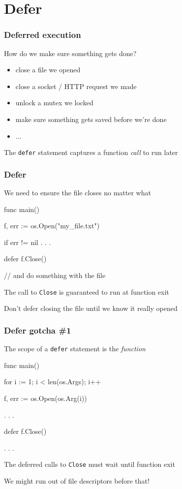 \documentclass[handout,compress,t,11pt]{beamer}
\begin{document}

\section{Defer}
\begin{frame}[fragile]
    \frametitle{Deferred execution}
    How do we make sure something gets done?
    \begin{itemize}
        \item close a file we opened
        \item close a socket / HTTP request we made
        \item unlock a mutex we locked
        \item make sure something gets saved before we're done
        \item ...
    \end{itemize}
\vspace{\baselineskip}
The \verb|defer| statement captures a function {\em call} to run later
\end{frame}

\begin{frame}[fragile]
    \frametitle{Defer}
    We need to ensure the file closes no matter what
\begin{golang}
func main() {
	f, err := os.Open("my_file.txt")

    if err != nil {
        . . .
    }

    defer f.Close()

    // and do something with the file
}
\end{golang}
\vspace{0.6\baselineskip}
The call to \verb|Close| is guaranteed to run at function exit \par
\vspace{0.4\baselineskip}
Don't defer closing the file until we know it really opened
\end{frame}

\begin{frame}[fragile]
    \frametitle{Defer gotcha \#1}
    The scope of a \verb|defer| statement is the {\em function}
\begin{golang}
func main() {
    for i := 1; i < len(os.Args); i++ {
	    f, err := os.Open(os.Arg(i))
    
        . . .

        defer f.Close()

        . . .
    }
}
\end{golang}
\vspace{0.6\baselineskip}
The deferred calls to \verb|Close| must wait until function exit \par
\vspace{0.4\baselineskip}
We might run out of file descriptors before that!
\end{frame}
\end{document}
